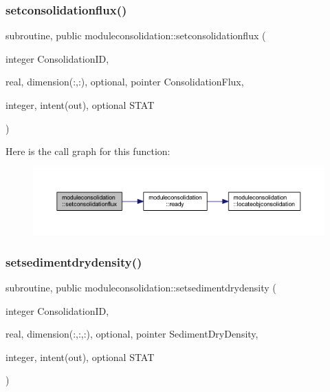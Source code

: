\subsubsection{\texorpdfstring{setconsolidationflux()}{setconsolidationflux()}}
{\footnotesize\ttfamily subroutine, public moduleconsolidation\+::setconsolidationflux (\begin{DoxyParamCaption}\item[{integer}]{Consolidation\+ID,  }\item[{real, dimension(\+:,\+:), optional, pointer}]{Consolidation\+Flux,  }\item[{integer, intent(out), optional}]{S\+T\+AT }\end{DoxyParamCaption})}

Here is the call graph for this function\+:\nopagebreak
\begin{figure}[H]
\begin{center}
\leavevmode
\includegraphics[width=350pt]{namespacemoduleconsolidation_a40ac455c6e9cb9d5dfa436553c29c193_cgraph}
\end{center}
\end{figure}
\mbox{\label{namespacemoduleconsolidation_a79a5986057fbc83932d56bb8bfcf6b3b}} 
\subsubsection{\texorpdfstring{setsedimentdrydensity()}{setsedimentdrydensity()}}
{\footnotesize\ttfamily subroutine, public moduleconsolidation\+::setsedimentdrydensity (\begin{DoxyParamCaption}\item[{integer}]{Consolidation\+ID,  }\item[{real, dimension(\+:,\+:,\+:), optional, pointer}]{Sediment\+Dry\+Density,  }\item[{integer, intent(out), optional}]{S\+T\+AT }\end{DoxyParamCaption})}

